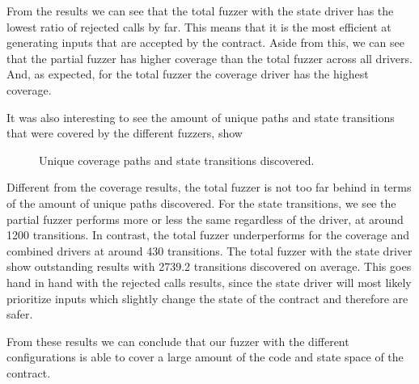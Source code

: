From the results we can see that the total fuzzer with the state driver has the lowest ratio of rejected calls by far.
This means that it is the most efficient at generating inputs that are accepted by the contract.
Aside from this, we can see that the partial fuzzer has higher coverage than the total fuzzer across all drivers.
And, as expected, for the total fuzzer the coverage driver has the highest coverage.

It was also interesting to see the amount of unique paths and state transitions that were covered by the different fuzzers, show


\begin{figure}[!htbp]
    \centering
    \hfill
    \caption{Unique coverage paths and state transitions discovered.}
    \label{fig:path-trans}
\end{figure}

Different from the coverage results, the total fuzzer is not too far behind in terms of the amount of unique paths discovered.
For the state transitions, we see the partial fuzzer performs more or less the same regardless of the driver, at around 1200 transitions.
In contrast, the total fuzzer underperforms for the coverage and combined drivers at around 430 transitions.
The total fuzzer with the state driver show outstanding results with 2739.2 transitions discovered on average.
This goes hand in hand with the rejected calls results, since the state driver will most likely prioritize inputs which slightly change the state of the contract and therefore are safer.

From these results we can conclude that our fuzzer with the different configurations is able to cover a large amount of the code and state space of the contract.